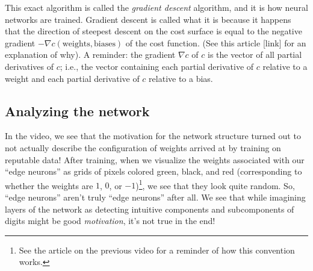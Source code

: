 \documentclass{article}
\begin{document}
	This exact algorithm is called the \textit{gradient descent} algorithm, and it is how neural networks are trained. Gradient descent is called what it is because it happens that the direction of steepest descent on the cost surface is equal to the negative gradient $-\nabla c(\text{weights}, \text{biases})$ of the cost function. (See this article [link] for an explanation of why). A reminder: the gradient $\nabla c$ of $c$ is the vector of all partial derivatives of $c$; i.e., the vector containing each partial derivative of $c$ relative to a weight and each partial derivative of $c$ relative to a bias.
	
	\subsection*{Analyzing the network}
	
	In the video, we see that the motivation for the network structure turned out to not actually describe the configuration of weights arrived at by training on reputable data! After training, when we visualize the weights associated with our ``edge neurons'' as grids of pixels colored green, black, and red (corresponding to whether the weights are $1$, $0$, or $-1$)\footnote{See the article on the previous video for a reminder of how this convention works.}, we see that they look quite random. So, ``edge neurons'' aren't truly ``edge neurons'' after all. We see that while imagining layers of the network as detecting intuitive components and subcomponents of digits might be good \textit{motivation}, it's not true in the end!
\end{document}
